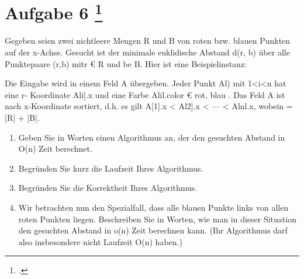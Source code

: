 \documentclass{lehramt-informatik-aufgabe}
\begin{document}
\section{Aufgabe 6
\footcite{46115:2020:03}}

Gegeben seien zwei nichtleere Mengen R und B von roten bzw. blauen
Punkten auf der x-Achse. Gesucht ist der minimale euklidische Abstand
d(r, b) über alle Punktepaare (r,b) mitr € R und be B. Hier ist eine
Beispielinstanz:

Die Eingabe wird in einem Feld A übergeben. Jeder Punkt Al) mit 1<i<n
hat eine r- Koordinate Ali].x und eine Farbe Alil.color € { rot, blau }.
Das Feld A ist nach x-Koordinate sortiert, d.h. es gilt A[1].x < Al2].x
< --- < Alnl.x, wobein = |R| + |B|.

\begin{enumerate}


\item Geben Sie in Worten einen Algorithmus an, der den gesuchten
Abstand in O(n) Zeit berechnet.


\item Begründen Sie kurz die Laufzeit Ihres Algorithmus.


\item Begründen Sie die Korrektheit Ihres Algorithmus.


\item Wir betrachten nun den Spezialfall, dass alle blauen Punkte links
von allen roten Punkten liegen. Beschreiben Sie in Worten, wie man in
dieser Situation den gesuchten Abstand in o(n) Zeit berechnen kann. (Ihr
Algorithmus darf also insbesondere nicht Laufzeit O(n) haben.)

\end{enumerate}
\end{document}
